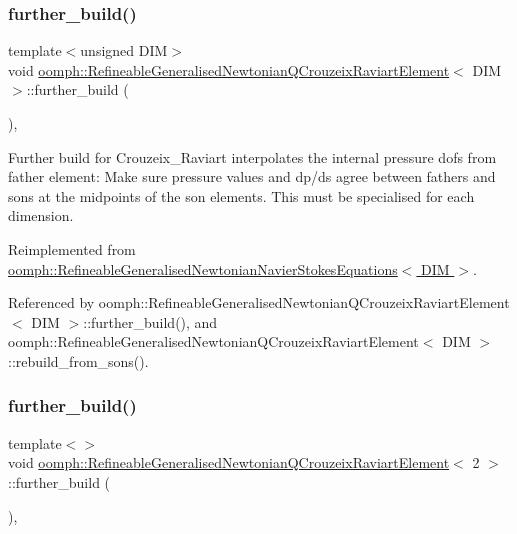 \subsubsection{\texorpdfstring{further\+\_\+build()}{further\_build()}\hspace{0.1cm}{\footnotesize\ttfamily [1/3]}}
{\footnotesize\ttfamily template$<$unsigned D\+IM$>$ \\
void \hyperlink{classoomph_1_1RefineableGeneralisedNewtonianQCrouzeixRaviartElement}{oomph\+::\+Refineable\+Generalised\+Newtonian\+Q\+Crouzeix\+Raviart\+Element}$<$ D\+IM $>$\+::further\+\_\+build (\begin{DoxyParamCaption}{ }\end{DoxyParamCaption})\hspace{0.3cm}{\ttfamily [inline]}, {\ttfamily [virtual]}}

Further build for Crouzeix\+\_\+\+Raviart interpolates the internal pressure dofs from father element\+: Make sure pressure values and dp/ds agree between fathers and sons at the midpoints of the son elements. This must be specialised for each dimension. 

Reimplemented from \hyperlink{classoomph_1_1RefineableGeneralisedNewtonianNavierStokesEquations_a53a4c5277d517f5df48df7c1953b2b02}{oomph\+::\+Refineable\+Generalised\+Newtonian\+Navier\+Stokes\+Equations$<$ D\+I\+M $>$}.



Referenced by oomph\+::\+Refineable\+Generalised\+Newtonian\+Q\+Crouzeix\+Raviart\+Element$<$ D\+I\+M $>$\+::further\+\_\+build(), and oomph\+::\+Refineable\+Generalised\+Newtonian\+Q\+Crouzeix\+Raviart\+Element$<$ D\+I\+M $>$\+::rebuild\+\_\+from\+\_\+sons().

\mbox{\label{classoomph_1_1RefineableGeneralisedNewtonianQCrouzeixRaviartElement_a4e9f97f8423604d44da0843a46bb797d}} 
\subsubsection{\texorpdfstring{further\+\_\+build()}{further\_build()}\hspace{0.1cm}{\footnotesize\ttfamily [2/3]}}
{\footnotesize\ttfamily template$<$$>$ \\
void \hyperlink{classoomph_1_1RefineableGeneralisedNewtonianQCrouzeixRaviartElement}{oomph\+::\+Refineable\+Generalised\+Newtonian\+Q\+Crouzeix\+Raviart\+Element}$<$ 2 $>$\+::further\+\_\+build (\begin{DoxyParamCaption}{ }\end{DoxyParamCaption})\hspace{0.3cm}{\ttfamily [inline]}, {\ttfamily [virtual]}}

